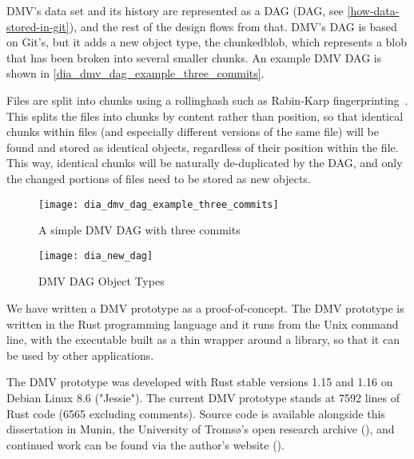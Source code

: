 %

\gls{DMV}'s data set and its history are represented as a \acrshort{DAG} (\acrlong{DAG}, see \autoref{how-data-stored-in-git}), and the rest of the design flows from that.
\gls{DMV}'s \gls{DAG} is based on Git's, but it adds a new object type, the \gls{chunkedblob}, which represents a \gls{blob} that has been broken into several smaller chunks.
An example \gls{DMV} \gls{DAG} is shown in \autoref{dia_dmv_dag_example_three_commits}.


Files are split into chunks using a \gls{rollinghash} such as Rabin-Karp fingerprinting~\cite{rabin_karp_fingerprinting}.
This splits the files into chunks by content rather than position, so that identical chunks within files (and especially different versions of the same file) will be found and stored as identical objects, regardless of their position within the file.
This way, identical chunks will be naturally de-duplicated by the \gls{DAG}, and only the changed portions of files need to be stored as new objects.


\begin{figure}[]
    \centering

    \begin{minipage}{.65\textwidth}
        \texttt{[image: dia\_dmv\_dag\_example\_three\_commits]}
        \caption{A simple DMV DAG with three commits}
        \label{dia_dmv_dag_example_three_commits}
    \end{minipage}%
    \begin{minipage}{.35\textwidth}
        \texttt{[image: dia\_new\_dag]}
        \caption{DMV DAG Object Types}
        \label{fig:dia_new_dag}
    \end{minipage}
\end{figure}


We have written a \gls{DMV} prototype as a proof-of-concept. The \gls{DMV}
prototype is written in the Rust programming language and it runs from the Unix
command line, with the executable built as a thin wrapper around a library, so
that it can be used by other applications.

The \gls{DMV} prototype was developed with Rust stable versions 1.15 and 1.16 on
Debian Linux 8.6 ("Jessie"). The current DMV prototype stands at \num{7592}
lines of Rust code (\num{6565} excluding comments). Source code is available
alongside this dissertation in Munin, the University of Tromsø's open research
archive (\muninurl), and continued work can be found via the author's website
(\dmvurl).
